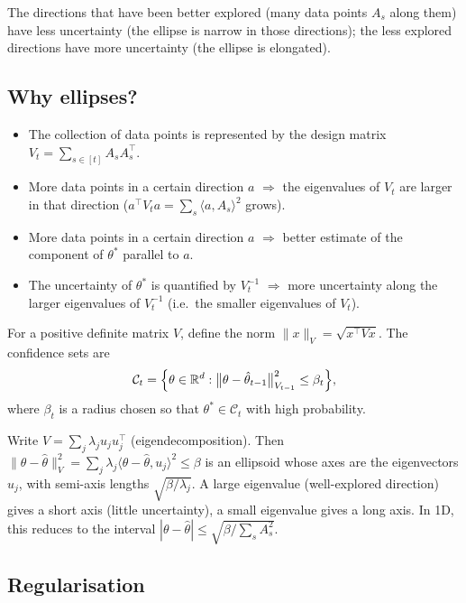 The directions that have been better explored (many data points $A_s$ along them) have less uncertainty (the ellipse is narrow in those directions); the less explored directions have more uncertainty (the ellipse is elongated).

\subsection{Why ellipses?}

\begin{itemize}
    \item The collection of data points is represented by the design matrix $V_t = \sum_{s\in[t]} A_sA_s^\top$.
    \item More data points in a certain direction $a$ $\Rightarrow$ the eigenvalues of $V_t$ are larger in that direction ($a^\top V_t a = \sum_s \langle a, A_s\rangle^2$ grows).
    \item More data points in a certain direction $a$ $\Rightarrow$ better estimate of the component of $\theta^*$ parallel to $a$.
    \item The uncertainty of $\theta^*$ is quantified by $V_t^{-1}$ $\Rightarrow$ more uncertainty along the larger eigenvalues of $V_t^{-1}$ (i.e.\ the smaller eigenvalues of $V_t$).
\end{itemize}

\begin{definition}
For a positive definite matrix $V$, define the norm $\|x\|_V = \sqrt{x^\top V x}$. The confidence sets are
\[
\mathcal{C}_t = \Big\{\theta \in \mathbb{R}^d : \big\|\theta - \hat{\theta}_{t-1}\big\|_{V_{t-1}}^2 \leq \beta_t\Big\},
\]
where $\beta_t$ is a radius chosen so that $\theta^* \in \mathcal{C}_t$ with high probability.
\end{definition}

\begin{remark}[Geometry]
Write $V = \sum_j \lambda_j u_ju_j^\top$ (eigendecomposition). Then $\|\theta - \hat{\theta}\|_V^2 = \sum_j \lambda_j \langle \theta - \hat{\theta}, u_j\rangle^2 \leq \beta$ is an ellipsoid whose axes are the eigenvectors $u_j$, with semi-axis lengths $\sqrt{\beta/\lambda_j}$. A large eigenvalue (well-explored direction) gives a short axis (little uncertainty), a small eigenvalue gives a long axis. In 1D, this reduces to the interval $|\theta - \hat{\theta}| \leq \sqrt{\beta/\sum_s A_s^2}$.
\end{remark}

\subsection{Regularisation}

